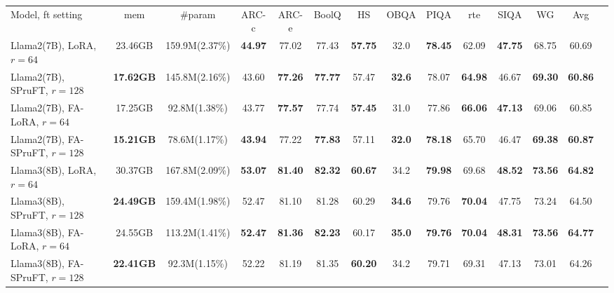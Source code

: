 \iffalse
\begin{table*}[htbp]
\tiny
\begin{center}
\begin{tabular}{lccccccccccccc}\toprule
Model, ft setting & mem & \#param & ARC-c & ARC-e & BoolQ & HS & OBQA & PIQA & rte & SIQA & WG & Avg
\\\cmidrule(lr){1-13}
Llama2(7B), LoRA, $r=64$ & 23.46GB & 159.9M(2.37\%) & \textbf{44.97} & 77.02 & 77.43 & \textbf{57.75} & 32.0 & \textbf{78.45} & 62.09 & \textbf{47.75} & 68.75 & 60.69\\
Llama2(7B), SPruFT, $r=128$ & \textbf{17.62GB} & 145.8M(2.16\%) & 43.60 & \textbf{77.26} & \textbf{77.77} & 57.47 & \textbf{32.6} & 78.07 & \textbf{64.98} & 46.67 & \textbf{69.30} & \textbf{60.86} \\\cmidrule(lr){2-13}
Llama2(7B), FA-LoRA, $r=64$ & 17.25GB & 92.8M(1.38\%) & 43.77 & \textbf{77.57} & 77.74 & \textbf{57.45} & 31.0 & 77.86 & \textbf{66.06} & \textbf{47.13} & 69.06 & 60.85\\
Llama2(7B), FA-SPruFT, $r=128$ & \textbf{15.21GB} & 78.6M(1.17\%) & \textbf{43.94} & 77.22 & \textbf{77.83} & 57.11 & \textbf{32.0} & \textbf{78.18} & 65.70 & 46.47 & \textbf{69.38} & \textbf{60.87}\\\midrule
Llama3(8B), LoRA, $r=64$ & 30.37GB & 167.8M(2.09\%) & \textbf{53.07} & \textbf{81.40} & \textbf{82.32} & \textbf{60.67} & 34.2 & \textbf{79.98} & 69.68 & \textbf{48.52} & \textbf{73.56} & \textbf{64.82}\\
Llama3(8B), SPruFT, $r=128$ & \textbf{24.49GB} & 159.4M(1.98\%) & 52.47 & 81.10 & 81.28 & 60.29 & \textbf{34.6} & 79.76 & \textbf{70.04} & 47.75 & 73.24 & 64.50 \\\cmidrule(lr){2-13}
Llama3(8B), FA-LoRA, $r=64$ & 24.55GB & 113.2M(1.41\%) & \textbf{52.47} & \textbf{81.36} & \textbf{82.23} & 60.17 & \textbf{35.0} & \textbf{79.76} & \textbf{70.04} & \textbf{48.31} & \textbf{73.56} & \textbf{64.77}\\
Llama3(8B), FA-SPruFT, $r=128$ & \textbf{22.41GB} & 92.3M(1.15\%) & 52.22 & 81.19 & 81.35 & \textbf{60.20} & 34.2 & 79.71 & 69.31 & 47.13 & 73.01 & 64.26 \\\bottomrule
\end{tabular}

\end{center}
\end{table*}
